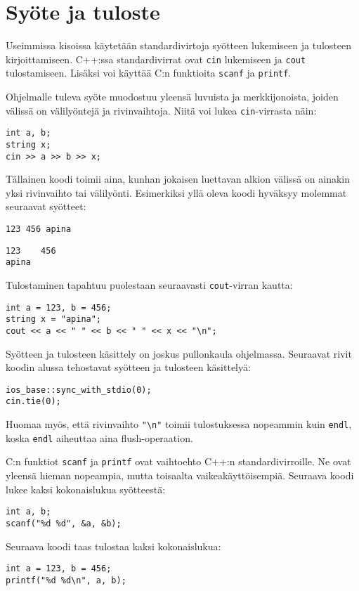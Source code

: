 \section{Syöte ja tuloste}


Useimmissa kisoissa käytetään
standardivirtoja syötteen lukemiseen ja tulosteen
kirjoittamiseen.
C++:ssa standardivirrat ovat \texttt{cin}
lukemiseen
ja \texttt{cout} tulostamiseen. Lisäksi voi käyttää
C:n funktioita \texttt{scanf} ja \texttt{printf}.

Ohjelmalle tuleva syöte muodostuu yleensä
luvuista ja merkkijonoista,
joiden välissä on välilyöntejä ja rivinvaihtoja.
Niitä voi lukea \texttt{cin}-virrasta näin:

\begin{lstlisting}
int a, b;
string x;
cin >> a >> b >> x;
\end{lstlisting}

Tällainen koodi toimii aina,
kunhan jokaisen luettavan alkion välissä
on ainakin yksi rivinvaihto tai välilyönti.
Esimerkiksi yllä oleva koodi hyväksyy
molemmat seuraavat syötteet:
\begin{lstlisting}
123 456 apina
\end{lstlisting}
\begin{lstlisting}
123    456
apina
\end{lstlisting}
Tulostaminen tapahtuu puolestaan seuraavasti
\texttt{cout}-virran kautta:
\begin{lstlisting}
int a = 123, b = 456;
string x = "apina";
cout << a << " " << b << " " << x << "\n";
\end{lstlisting}

Syötteen ja tulosteen käsittely on joskus
pullonkaula ohjelmassa.
Seuraavat rivit koodin alussa tehostavat
syötteen ja tulosteen käsittelyä:

\begin{lstlisting}
ios_base::sync_with_stdio(0);
cin.tie(0);
\end{lstlisting}

Huomaa myös, että rivinvaihto \texttt{"\textbackslash n"}
toimii tulostuksessa nopeammin kuin \texttt{endl},
koska \texttt{endl} aiheuttaa
aina flush-operaation.

C:n funktiot \texttt{scanf}
ja \texttt{printf} ovat vaihtoehto
C++:n standardivirroille.
Ne ovat yleensä hieman nopeampia,
mutta toisaalta vaikeakäyttöisempiä.
Seuraava koodi lukee kaksi kokonaislukua syötteestä:
\begin{lstlisting}
int a, b;
scanf("%d %d", &a, &b);
\end{lstlisting}
Seuraava koodi taas tulostaa kaksi kokonaislukua:
\begin{lstlisting}
int a = 123, b = 456;
printf("%d %d\n", a, b);
\end{lstlisting}

